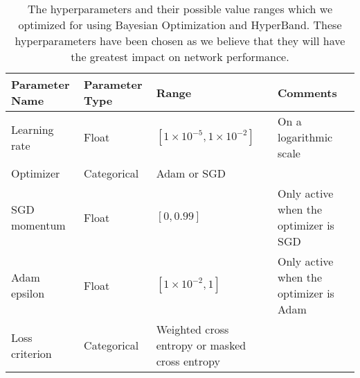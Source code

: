 \begin{table}[]
\begin{tabular}{@{}llp{3.9cm}p{3cm}@{}}
\toprule
Parameter Name    & Parameter Type & Range                                            & Comments                               \\ \midrule
Learning rate     & Float          & $\left[1 \times 10^{-5}, 1 \times 10^{-2}\right]$& On a logarithmic scale                \\
Optimizer         & Categorical    & Adam or SGD                                      &                                      \\
SGD momentum      & Float          & $\left[0, 0.99\right]$                           & Only active when the optimizer is SGD\\
Adam epsilon      & Float          & $\left[1 \times 10^{-2}, 1\right]$               & Only active when the optimizer is Adam\\
Loss criterion    & Categorical    & Weighted cross entropy or masked cross entropy   &                                      \\ \bottomrule
\end{tabular}
\caption[Hyperparameter Details]{The hyperparameters and their possible value ranges which we optimized for using Bayesian Optimization and HyperBand. These hyperparameters have been chosen as we believe that they will have the greatest impact on network performance.}
\label{tab:hyperparameters}
\end{table}